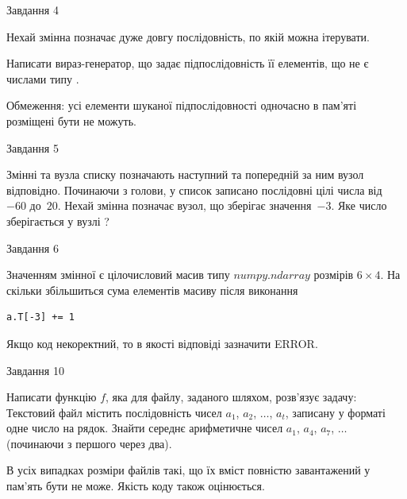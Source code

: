 \documentclass[12pt, ukrainian]{article}
\begin{document}
{               
{\begin{center}Завдання {4}\end{center}}
\vspace{-6mm}
Нехай змінна  позначає дуже довгу послідовність, по якій можна ітерувати.

Написати вираз-генератор, що задає підпослідовність її елементів, що не є числами типу .

Обмеження: усі елементи шуканої підпослідовності одночасно в пам'яті розміщені бути не можуть.\par

\vspace{10mm}
               
{\begin{center}Завдання {5}\end{center}}
\vspace{-6mm}
Змінні  та  вузла списку позначають наступний та попередній за ним вузол відповідно. Починаючи з голови, у список записано послідовні цілі числа від~$-60$ до~$20$. Нехай змінна  позначає вузол, що зберігає значення~$-3$.
Яке число зберігається у вузлі  ?\par

               
{\begin{center}Завдання {6}\end{center}}
\vspace{-6mm}
Значенням змінної  є цілочисловий масив типу $numpy.ndarray$ розмірів $6{\times}4$. На скільки збільшиться сума елементів масиву  після виконання
\begin{verbatim}
a.T[-3] += 1
\end{verbatim}


Якщо код некоректний, то в якості відповіді зазначити ERROR.\par

               
{\begin{center}Завдання {10}\end{center}}
\vspace{-6mm}

Написати функцію $f$, яка для файлу, заданого шляхом, розв’язує задачу:\\ Текстовий файл містить послідовність чисел $a_1$, $a_2$, $\ldots$, $a_t$, записану у форматі одне число на рядок. Знайти середнє арифметичне чисел $a_1$, $a_4$, $a_7$, $\ldots$ (починаючи з першого через два).

В усіх випадках розміри файлів такі, що їх вміст повністю завантажений у пам'ять бути не може. Якість коду також оцінюється.



}
\end{document}
